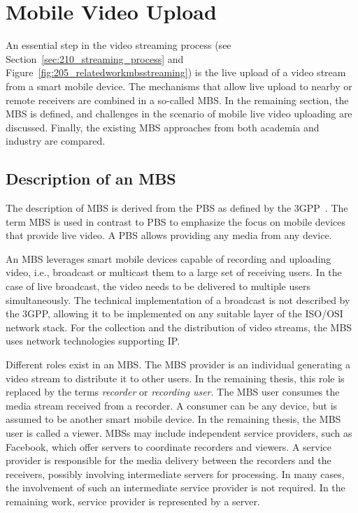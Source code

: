 \section{Mobile Video Upload}
\label{sec:220_videoupload}

An essential step in the video streaming process (see Section~\ref{sec:210_streaming_process} and Figure~\ref{fig:205_relatedworkmbsstreaming}) is the live upload of a video stream from a smart mobile device.
The mechanisms that allow live upload to nearby or remote receivers are combined in a so-called \acf{MBS}.
In the remaining section, the \ac{MBS} is defined, and challenges in the scenario of mobile live video uploading are discussed. 
Finally, the existing \ac{MBS} approaches from both academia and industry are compared. 
\subsection{Description of an MBS}
The description of \ac{MBS} is derived from the \ac{PBS} as defined by the \ac{3GPP}~\cite{3GPP}.
The term \ac{MBS} is used in contrast to \ac{PBS} to emphasize the focus on mobile devices that provide live video.
A \ac{PBS} allows providing any media from any device.

An \ac{MBS} leverages smart mobile devices capable of recording and uploading video, i.e., broadcast or multicast them to a large set of receiving users. 
In the case of live broadcast, the video needs to be delivered to multiple users simultaneously.
The technical implementation of a broadcast is not described by the \ac{3GPP}, allowing it to be implemented on any suitable layer of the \ac{ISO}/\ac{OSI} network stack.
For the collection and the distribution of video streams, the \ac{MBS} uses network technologies supporting \ac{IP}.

Different roles exist in an \ac{MBS}.
The \ac{MBS} provider is an individual generating a video stream to distribute it to other users. 
In the remaining thesis, this role is replaced by the terms \emph{recorder} or \emph{recording user}.
The \ac{MBS} user consumes the media stream received from a recorder.
A consumer can be any device, but is assumed to be another smart mobile device. %
In the remaining thesis, the \ac{MBS} user is called a viewer.
\ac{MBS}s may include independent service providers, such as Facebook, which offer servers to coordinate recorders and viewers. 
A service provider is responsible for the media delivery between the recorders and the receivers, possibly involving intermediate servers for processing.
In many cases, the involvement of such an intermediate service provider is not required. %
In the remaining work, service provider is represented by a server.
